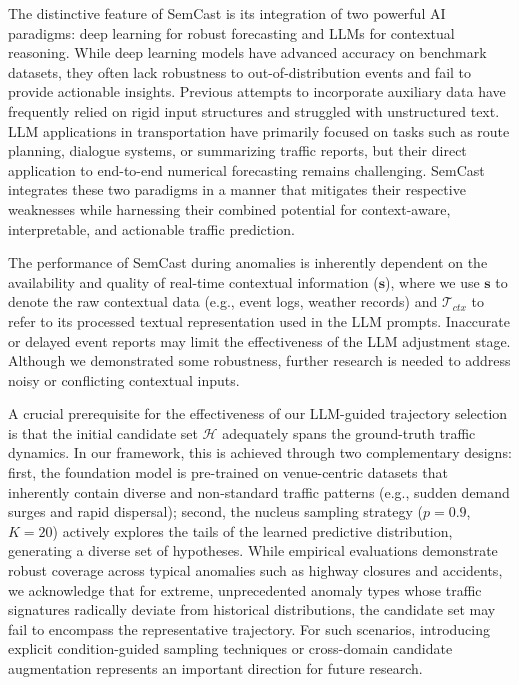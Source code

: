\documentclass{article}
\begin{document}
The distinctive feature of SemCast is its integration of two powerful AI paradigms: deep learning for robust forecasting and LLMs for contextual reasoning. While deep learning models have advanced accuracy on benchmark datasets, they often lack robustness to out-of-distribution events and fail to provide actionable insights. Previous attempts to incorporate auxiliary data have frequently relied on rigid input structures and struggled with unstructured text. LLM applications in transportation have primarily focused on tasks such as route planning, dialogue systems, or summarizing traffic reports, but their direct application to end-to-end numerical forecasting remains challenging. SemCast integrates these two paradigms in a manner that mitigates their respective weaknesses while harnessing their combined potential for context-aware, interpretable, and actionable traffic prediction.

The performance of SemCast during anomalies is inherently dependent on the availability and quality of real-time contextual information ($\mathbf{s}$), where we use $\mathbf{s}$ to denote the raw contextual data (e.g., event logs, weather records) and $\mathcal{T}_{ctx}$ to refer to its processed textual representation used in the LLM prompts. Inaccurate or delayed event reports may limit the effectiveness of the LLM adjustment stage. Although we demonstrated some robustness, further research is needed to address noisy or conflicting contextual inputs.

A crucial prerequisite for the effectiveness of our LLM-guided trajectory selection is that the initial candidate set $\mathcal{H}$ adequately spans the ground-truth traffic dynamics. In our framework, this is achieved through two complementary designs: first, the foundation model is pre-trained on venue-centric datasets that inherently contain diverse and non-standard traffic patterns (e.g., sudden demand surges and rapid dispersal); second, the nucleus sampling strategy ($p=0.9$, $K=20$) actively explores the tails of the learned predictive distribution, generating a diverse set of hypotheses. While empirical evaluations demonstrate robust coverage across typical anomalies such as highway closures and accidents, we acknowledge that for extreme, unprecedented anomaly types whose traffic signatures radically deviate from historical distributions, the candidate set may fail to encompass the representative trajectory. For such scenarios, introducing explicit condition-guided sampling techniques or cross-domain candidate augmentation represents an important direction for future research.
\end{document}
